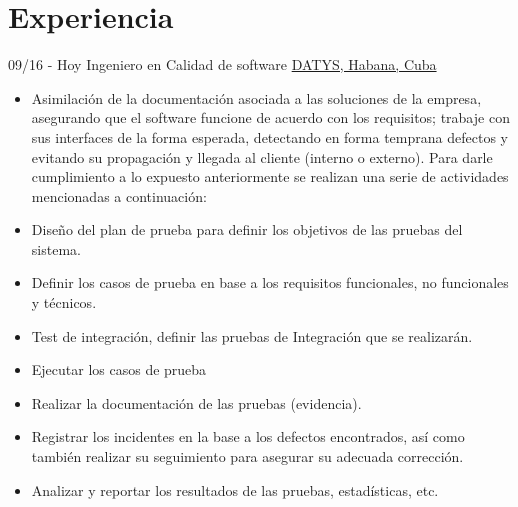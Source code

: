 \documentclass[letterpaper]{twentysecondcv} %
\begin{document}
\makeprofile %
 

\section{Experiencia}

\begin{twenty} %
\twentyitem
    	{09/16 - Hoy}
		{}
        {Ingeniero en Calidad de software}
        {\href{http://datys.cu/}{DATYS, Habana, Cuba}}
        {}
        {
        {\begin{itemize}
        \item Asimilación de la documentación asociada a las soluciones de la empresa, asegurando que el software  funcione de acuerdo con los requisitos; trabaje con sus interfaces de la forma esperada, detectando en forma temprana defectos y evitando su propagación y llegada al cliente (interno o externo). Para darle cumplimiento a lo expuesto anteriormente se realizan una serie de actividades mencionadas a continuación:
\item Diseño del plan de prueba para definir los objetivos de las pruebas del sistema.
\item Definir los casos de prueba en base a los requisitos funcionales, no funcionales y técnicos.
\item Test de integración, definir las pruebas de Integración que se realizarán.
\item Ejecutar los casos de prueba
\item Realizar la documentación de las pruebas (evidencia).
\item Registrar los incidentes en la base a los defectos encontrados, así como también realizar su seguimiento para asegurar su adecuada corrección.
\item Analizar y reportar los resultados de las pruebas, estadísticas, etc. 
        \end{itemize}}
        }
        
\end{twenty}

\end{document}
